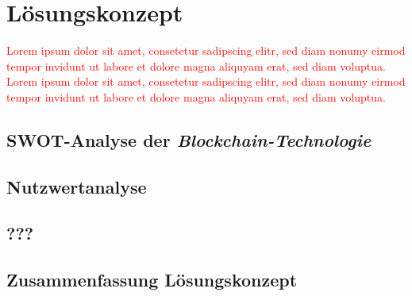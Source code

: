 \section{Lösungskonzept}
\textcolor{red}{Lorem ipsum dolor sit amet, consetetur sadipscing elitr, sed diam nonumy eirmod tempor invidunt ut labore et dolore magna aliquyam erat, sed diam voluptua. Lorem ipsum dolor sit amet, consetetur sadipscing elitr, sed diam nonumy eirmod tempor invidunt ut labore et dolore magna aliquyam erat, sed diam voluptua.}

\subsection{SWOT-Analyse der \textit{Blockchain-Technologie}}

\subsection{Nutzwertanalyse}

\subsection{???}

\subsection{Zusammenfassung Lösungskonzept}

\newpage
